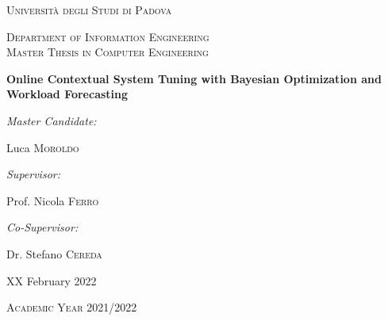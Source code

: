 \documentclass[a4paper, 12pt]{article} %
\begin{document}
	
	\begin{titlepage}
		\centering
		\vspace*{1cm}
		{\par \scshape\LARGE Università degli Studi di Padova \par}
		\vspace{1cm}
		{\scshape\Large Department of Information Engineering\\Master Thesis in Computer Engineering\par}
		\vspace{1.5cm}
		{\huge\bfseries Online Contextual System Tuning with Bayesian Optimization and Workload Forecasting\par}
		\vspace{2cm}
		{ \large \itshape Master Candidate:}
		{ \large Luca \textsc{Moroldo} \par}
		\vspace{0.7cm}
		{ \large \itshape Supervisor:}
		{ \large Prof. Nicola \textsc{Ferro} \par}
		{ \large \itshape Co-Supervisor:}
		{ \large Dr. Stefano \textsc{Cereda} \par}
		\vfill
		
		{ \large XX February 2022 \par}
		{ \large \textsc{Academic Year 2021/2022}\par}
	\end{titlepage}
	
	\clearpage%
	\thispagestyle{empty}%
	\addtocounter{page}{-1}%
	\null%
	\clearpage
	
	\newpage
	\thispagestyle{plain}
\end{document}
